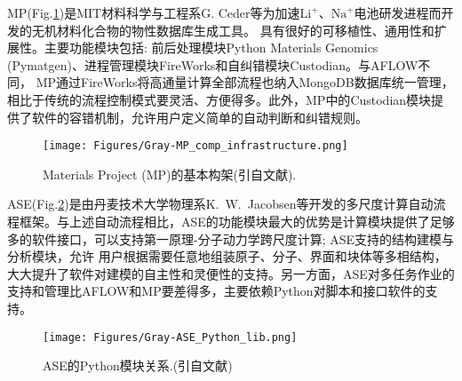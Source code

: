 \textrm{MP}(\textrm{Fig.}\ref{Auto_Flow_Platform-2})是\textrm{MIT}材料科学与工程系\textrm{G. Ceder}等为加速$\mathrm{Li}^+$、$\mathrm{Na}^+$电池研发进程而开发的无机材料化合物的物性数据库生成工具。%
具有很好的可移植性、通用性和扩展性。主要功能模块包括: 前后处理模块\textrm{Python Materials Genomics (Pymatgen)}\cite{CMS68-314_2013}、进程管理模块\textrm{FireWorks}和自纠错模块\textrm{Custodian}。与\textrm{AFLOW}不同， \textrm{MP}通过\textrm{FireWorks}将高通量计算全部流程也纳入\textrm{MongoDB}数据库统一管理，相比于传统的流程控制模式要灵活、方便得多。此外，\textrm{MP}中的\textrm{Custodian}模块提供了软件的容错机制，允许用户定义简单的自动判断和纠错规则。
\begin{figure}[h!]
\centering
\texttt{[image: Figures/Gray-MP\_comp\_infrastructure.png]}%
\caption{\textrm{Materials Project (MP)}的基本构架(引自文献\cite{CMS97-209_2015}).}%
\label{Auto_Flow_Platform-2}
\end{figure}

\textrm{ASE}(\textrm{Fig.}\ref{Auto_Flow_Platform-5})是由丹麦技术大学物理系\textrm{K.~W.~Jacobsen}等开发的多尺度计算自动流程框架。与上述自动流程相比，\textrm{ASE}的功能模块最大的优势是计算模块提供了足够多的软件接口，可以支持第一原理-分子动力学跨尺度计算; \textrm{ASE}支持的结构建模与分析模块，允许 用户根据需要任意地组装原子、分子、界面和块体等多相结构，大大提升了软件对建模的自主性和灵便性的支持。另一方面，\textrm{ASE}对多任务作业的支持和管理比\textrm{AFLOW}和\textrm{MP}要差得多，主要依赖\textrm{Python}对脚本和接口软件的支持。
\begin{figure}[h!]
\centering
\texttt{[image: Figures/Gray-ASE\_Python\_lib.png]}%
\caption{\textrm{ASE}的\textrm{Python}模块关系.(引自文献\cite{JPCM29-273002_2017})}
\label{Auto_Flow_Platform-5}
\end{figure}

